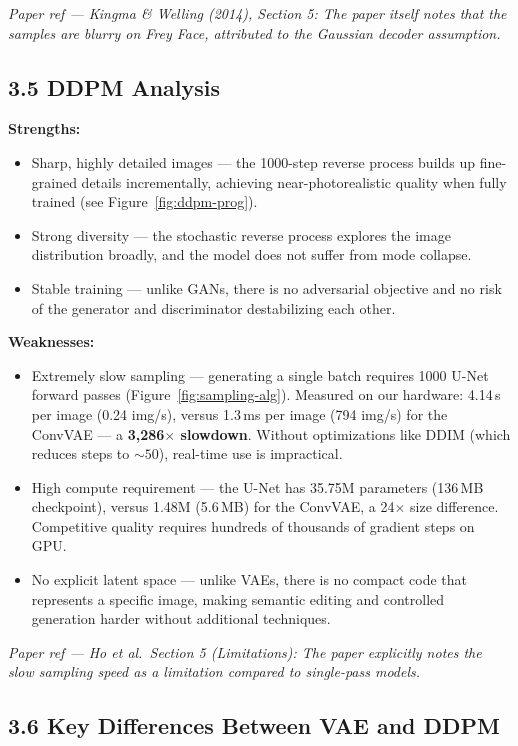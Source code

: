 \documentclass{article}
\newcommand{\paperref}[1]{{\color{paperrefcolor}\emph{#1}}}
\begin{document}
\paperref{Paper ref --- Kingma \& Welling (2014), Section 5: The paper itself notes that the samples are blurry on Frey Face, attributed to the Gaussian decoder assumption.}

\subsection{3.5 \; DDPM Analysis}

\textbf{Strengths:}
\begin{itemize}
    \item Sharp, highly detailed images --- the 1000-step reverse process builds up fine-grained details incrementally, achieving near-photorealistic quality when fully trained (see Figure~\ref{fig:ddpm-prog}).
    \item Strong diversity --- the stochastic reverse process explores the image distribution broadly, and the model does not suffer from mode collapse.
    \item Stable training --- unlike GANs, there is no adversarial objective and no risk of the generator and discriminator destabilizing each other.
\end{itemize}

\textbf{Weaknesses:}
\begin{itemize}
    \item Extremely slow sampling --- generating a single batch requires 1000 U-Net forward passes (Figure~\ref{fig:sampling-alg}). Measured on our hardware: 4.14\,s per image (0.24 img/s), versus 1.3\,ms per image (794 img/s) for the ConvVAE --- a \textbf{3,286$\times$ slowdown}. Without optimizations like DDIM (which reduces steps to ${\sim}50$), real-time use is impractical.
    \item High compute requirement --- the U-Net has 35.75M parameters (136\,MB checkpoint), versus 1.48M (5.6\,MB) for the ConvVAE, a 24$\times$ size difference. Competitive quality requires hundreds of thousands of gradient steps on GPU.
    \item No explicit latent space --- unlike VAEs, there is no compact code that represents a specific image, making semantic editing and controlled generation harder without additional techniques.
\end{itemize}

\paperref{Paper ref --- Ho et al.\ Section 5 (Limitations): The paper explicitly notes the slow sampling speed as a limitation compared to single-pass models.}

\subsection{3.6 \; Key Differences Between VAE and DDPM}
\end{document}
